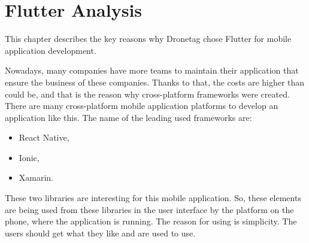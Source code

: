 \chapter{Flutter Analysis}\label{ch:flutter-analysis}

This chapter describes the key reasons why Dronetag chose Flutter for mobile application development.

Nowadays, many companies have more teams to maintain their application that ensure the business of these companies.
Thanks to that, the costs are higher than could be, and that is the reason why cross-platform frameworks were created.
There are many cross-platform mobile application platforms to develop an application like this.
The name of the leading used frameworks are:
\begin{itemize}
    \item React Native,
    \item Ionic,
    \item Xamarin.
\end{itemize}
















These two libraries are interesting for this mobile application.
So, these elements are being used from these libraries in the user interface by the platform on the phone, where the application is running.
The reason for using is simplicity.
The users should get what they like and are used to use.
